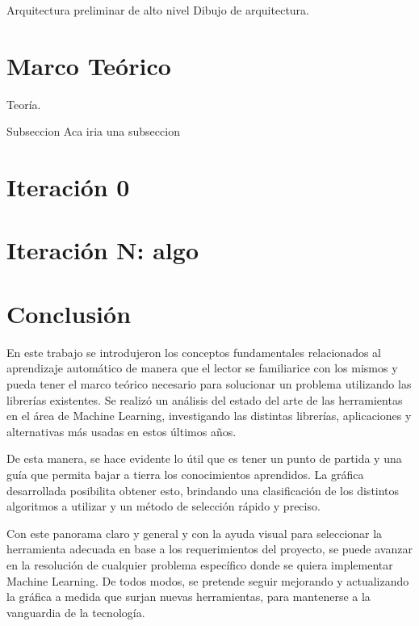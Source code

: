 \documentclass{scrartcl}
\begin{document}
		\begin{subsection}{Arquitectura preliminar de alto nivel}
			Dibujo de arquitectura.
		\end{subsection}
	
	\section{Marco Teórico}
		Teoría.
	
		\begin{subsection}{Subseccion}
			Aca iria una subseccion
		\end{subsection}
	
	\section{Iteración 0}

	\section{Iteración N: algo}
	
	\section{Conclusión}
		En este trabajo se introdujeron los conceptos fundamentales relacionados al aprendizaje automático
		de manera que el lector se familiarice con los mismos y pueda tener el marco teórico necesario 
		para solucionar un problema utilizando las librerías existentes. Se realizó un análisis del 
		estado del arte de las herramientas en el área de Machine Learning, investigando las distintas 
		librerías, aplicaciones y alternativas más usadas en estos últimos años.
		
		\medskip De esta manera, se hace evidente lo útil que es tener un punto de partida y una guía que permita bajar
		a tierra los conocimientos aprendidos. La gráfica desarrollada posibilita obtener esto, brindando una
		clasificación de los distintos algoritmos a utilizar y un método de selección rápido y preciso.
		
		\medskip Con este panorama claro y general y con la ayuda visual para seleccionar la herramienta
		adecuada en base a los requerimientos del proyecto, se puede avanzar en la resolución de cualquier
		problema específico donde se quiera implementar Machine Learning. De todos modos, se pretende seguir
		mejorando y actualizando la gráfica a medida que surjan nuevas herramientas, para mantenerse a la vanguardia de la 
		tecnología.

	\cleardoublepage

	
		
\end{document}
